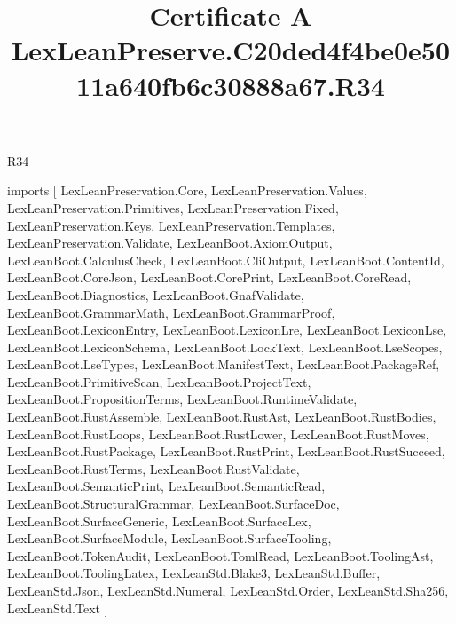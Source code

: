 \begin{lexlean}{R34}
\title{Certificate A LexLeanPreserve.C20ded4f4be0e5011a640fb6c30888a67.R34}
\begin{coremodule}
imports [
  LexLeanPreservation.Core,
  LexLeanPreservation.Values,
  LexLeanPreservation.Primitives,
  LexLeanPreservation.Fixed,
  LexLeanPreservation.Keys,
  LexLeanPreservation.Templates,
  LexLeanPreservation.Validate,
  LexLeanBoot.AxiomOutput,
  LexLeanBoot.CalculusCheck,
  LexLeanBoot.CliOutput,
  LexLeanBoot.ContentId,
  LexLeanBoot.CoreJson,
  LexLeanBoot.CorePrint,
  LexLeanBoot.CoreRead,
  LexLeanBoot.Diagnostics,
  LexLeanBoot.GnafValidate,
  LexLeanBoot.GrammarMath,
  LexLeanBoot.GrammarProof,
  LexLeanBoot.LexiconEntry,
  LexLeanBoot.LexiconLre,
  LexLeanBoot.LexiconLse,
  LexLeanBoot.LexiconSchema,
  LexLeanBoot.LockText,
  LexLeanBoot.LseScopes,
  LexLeanBoot.LseTypes,
  LexLeanBoot.ManifestText,
  LexLeanBoot.PackageRef,
  LexLeanBoot.PrimitiveScan,
  LexLeanBoot.ProjectText,
  LexLeanBoot.PropositionTerms,
  LexLeanBoot.RuntimeValidate,
  LexLeanBoot.RustAssemble,
  LexLeanBoot.RustAst,
  LexLeanBoot.RustBodies,
  LexLeanBoot.RustLoops,
  LexLeanBoot.RustLower,
  LexLeanBoot.RustMoves,
  LexLeanBoot.RustPackage,
  LexLeanBoot.RustPrint,
  LexLeanBoot.RustSucceed,
  LexLeanBoot.RustTerms,
  LexLeanBoot.RustValidate,
  LexLeanBoot.SemanticPrint,
  LexLeanBoot.SemanticRead,
  LexLeanBoot.StructuralGrammar,
  LexLeanBoot.SurfaceDoc,
  LexLeanBoot.SurfaceGeneric,
  LexLeanBoot.SurfaceLex,
  LexLeanBoot.SurfaceModule,
  LexLeanBoot.SurfaceTooling,
  LexLeanBoot.TokenAudit,
  LexLeanBoot.TomlRead,
  LexLeanBoot.ToolingAst,
  LexLeanBoot.ToolingLatex,
  LexLeanStd.Blake3,
  LexLeanStd.Buffer,
  LexLeanStd.Json,
  LexLeanStd.Numeral,
  LexLeanStd.Order,
  LexLeanStd.Sha256,
  LexLeanStd.Text
]


\end{coremodule}
\end{lexlean}
